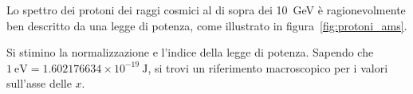 \begin{exercise}

Lo spettro dei protoni dei raggi cosmici al di sopra dei 10~GeV
è ragionevolmente ben descritto da una legge di potenza, come illustrato in
figura~\ref{fig:protoni_ams}.


Si stimino la normalizzazione e l'indice della legge di potenza.
Sapendo che $1~\text{eV} = 1.602176634 \times 10^{-19}~\text{J}$, si trovi un
riferimento macroscopico per i valori sull'asse delle $x$.

\end{exercise}



